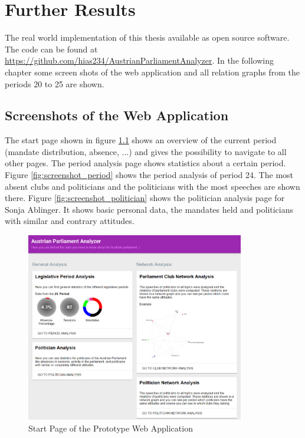 

\chapter{Further Results}
\label{appendix:FurtherResults}

The real world implementation of this thesis available as open source software. The code can be found at \url{https://github.com/hias234/AustrianParliamentAnalyzer}. In the following chapter some screen shots of the web application and all relation graphs from the periods 20 to 25 are shown.

\section{Screenshots of the Web Application}

The start page shown in figure \ref{fig:start_page} shows an overview of the current period (mandate distribution, absence, ...) and gives the possibility to navigate to all other pages. The period analysis page shows statistics about a certain period. Figure \ref{fig:screenshot_period} shows the period analysis of period 24. The most absent clubs and politicians and the politicians with the most speeches are shown there. Figure \ref{fig:screenshot_politician} shows the politician analysis page for Sonja Ablinger. It shows basic personal data, the mandates held and politicians with similar and contrary attitudes.

\begin{figure}[h]
	\center
	\includegraphics[width=0.85\textwidth]{imgs/result_start_page}
	\caption{Start Page of the Prototype Web Application}
	\label{fig:start_page}
\end{figure}

